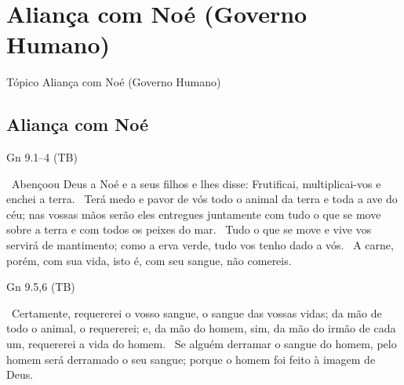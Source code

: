 \documentclass[12pt,aspectratio=169]{beamer}
\newcommand{\ver}[1]{%
    \raisebox{0.50ex}{%
        \scalebox{1.1}{%
            \pmb{\textbf{\textcolor{BSpbg}{#1}}}%
        }%
    }%
}
\newcommand{\QUOTE}[1]{%
    \par\noindent\hspace*{0.05\linewidth}%
    \begin{minipage}{0.9\linewidth}%
        \linespread{1.35}\large{#1}%
    \end{minipage}%
}
\newcommand{\RED}[1]{{\textcolor{TXred}{#1}}}
\newcommand{\ORA}[1]{{\textcolor{TXred!50!TXyel}{#1}}}
\newcommand{\YEL}[1]{{\textcolor{TXyel}{#1}}}
\newcommand{\GRE}[1]{{\textcolor{TXgre}{#1}}}
\newcommand{\CYA}[1]{{\textcolor{TXcya}{#1}}}
\begin{document}
\section{Aliança com Noé (Governo Humano)}

    \begin{frame}
        \par\noindent\hspace*{0.05\linewidth}%
        \begin{minipage}{0.9\linewidth}%
            \large%
            \begin{alertblock}{Tópico}
                Aliança com Noé (Governo Humano)
            \end{alertblock}
        \end{minipage}%
    \end{frame}

    \subsection{Aliança com Noé}

    \begin{frame}{Gn 9.1--4 (TB)}
        \QUOTE{%
            \ver{1}~Abençoou Deus a Noé e a seus filhos e lhes disse: \YEL{Frutificai,
            multiplicai-vos e enchei a terra}.
            \ver{2}~Terá \ORA{medo e pavor de vós todo o animal da terra e toda a ave do céu};
            nas vossas mãos serão eles entregues juntamente com tudo o que se move sobre a terra
            e com todos os peixes do mar.
            \ver{3}~Tudo o que se move e vive vos servirá de mantimento; \YEL{como a erva verde,
            tudo vos tenho dado a vós}.
            \ver{4}~A carne, porém, com sua vida, isto é, com seu \RED{sangue, não comereis}.
        }
    \end{frame}

    \begin{frame}{Gn 9.5,6 (TB)}
        \QUOTE{%
            \ver{5}~\YEL{Certamente, requererei o vosso sangue}, o sangue das vossas vidas;
            \ORA{da mão de todo o animal, o requererei}; e, \RED{da mão do homem}, sim, da mão
            do irmão de cada um, requererei a vida do homem.
            \ver{6}~\YEL{Se alguém derramar o sangue do homem}, \GRE{pelo homem será derramado o
            seu sangue}; porque \CYA{o homem foi feito à imagem de Deus}.
        }
    \end{frame}
\end{document}

